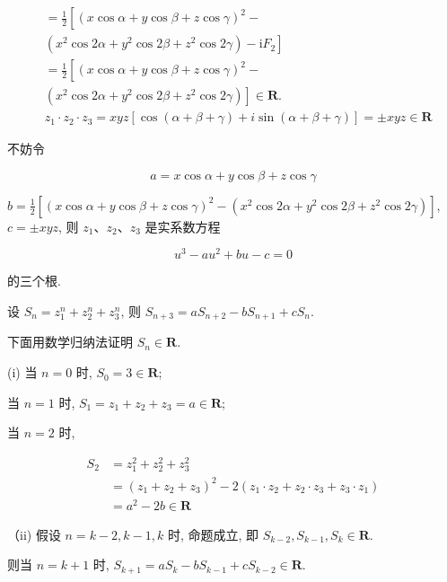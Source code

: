 	$$
		\begin{aligned}
			 & =\frac{1}{2}\left[(x \cos \alpha+y \cos \beta+z \cos \gamma)^{2}-\right.                                               \\
			 & \left.\left(x^{2} \cos 2 \alpha+y^{2} \cos 2 \beta+z^{2} \cos 2 \gamma\right)-\mathrm{i} F_{2}\right]                  \\
			 & =\frac{1}{2}\left[(x \cos \alpha+y \cos \beta+z \cos \gamma)^{2}-\right.                                               \\
			 & \left.\left(x^{2} \cos 2 \alpha+y^{2} \cos 2 \beta+z^{2} \cos 2 \gamma\right)\right] \in \mathbf{R} .                  \\
			 & z_{1} \cdot z_{2} \cdot z_{3}=x y z[\cos (\alpha+\beta+\gamma)+i \sin (\alpha+\beta+\gamma)]= \pm x y z \in \mathbf{R}
		\end{aligned}
	$$

	不妨令

	$$
		a=x \cos \alpha+y \cos \beta+z \cos \gamma
	$$

$b=\frac{1}{2}\left[(x \cos \alpha+y \cos \beta+z \cos \gamma)^{2}-\left(x^{2} \cos 2 \alpha+y^{2} \cos 2 \beta+z^{2} \cos 2 \gamma\right)\right]$, $c= \pm x y z$, 则 $z_{1} 、 z_{2} 、 z_{3}$ 是实系数方程

	$$
		u^{3}-a u^{2}+b u-c=0
	$$

	的三个根.

	设 $S_{n}=z_{1}^{n}+z_{2}^{n}+z_{3}^{n}$, 则 $S_{n+3}=a S_{n+2}-b S_{n+1}+c S_{n}$.

	下面用数学归纳法证明 $S_{n} \in \mathbf{R}$.

	(i) 当 $n=0$ 时, $S_{0}=3 \in \mathbf{R}$;

	当 $n=1$ 时, $S_{1}=z_{1}+z_{2}+z_{3}=a \in \mathbf{R}$;

	当 $n=2$ 时,

	$$
		\begin{aligned}
			S_{2} & =z_{1}^{2}+z_{2}^{2}+z_{3}^{2}                                                                          \\
			      & =\left(z_{1}+z_{2}+z_{3}\right)^{2}-2\left(z_{1} \cdot z_{2}+z_{2} \cdot z_{3}+z_{3} \cdot z_{1}\right) \\
			      & =a^{2}-2 b \in \mathbf{R}
		\end{aligned}
	$$

	（ii) 假设 $n=k-2, k-1, k$ 时, 命题成立, 即 $S_{k-2}, S_{k-1}, S_{k} \in \mathbf{R}$.

	则当 $n=k+1$ 时, $S_{k+1}=a S_{k}-b S_{k-1}+c S_{k-2} \in \mathbf{R}$.

